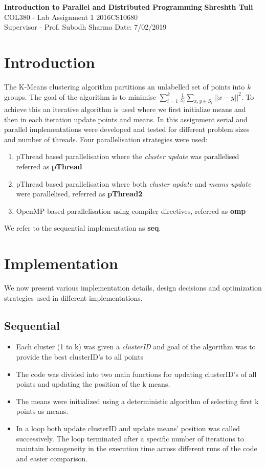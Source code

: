 \documentclass[letter, 11pt, margin=1in]{article}
\begin{document}
\noindent
\large\textbf{Introduction to Parallel and Distributed Programming} \hfill \textbf{Shreshth Tuli} \\
\normalsize COL380 - Lab Assignment 1 \hfill 2016CS10680\\
Supervisor - Prof. Subodh Sharma \hfill Date: 7/02/2019 \\

\section*{Introduction}

The K-Means clustering algorithm partitions an unlabelled set of points into \textit{k} groups. The goal of the algorithm is to minimise $\sum_{i=1}^k\frac{1}{S_i}\sum_{x,y\in S_i}||x-y||^2$. To achieve this an iterative algorithm is used where we first initialize means and then in each iteration update points and means. In this assignment serial and parallel implementations were developed and tested for different problem sizes and number of threads. Four parallelisation strategies were used:
\begin{enumerate}
    \item pThread based parallelisation where the \textit{cluster update} was parallelised referred as \textbf{pThread}
    \item pThread based parallelisation where both \textit{cluster update} and \textit{means update} were parallelised, referred as \textbf{pThread2}
    \item OpenMP based parallelisation using compiler directives, referred as \textbf{omp}
\end{enumerate}
We refer to the sequential implementation as \textbf{seq}.

\section{Implementation}
We now present various implementation details, design decisions and optimization strategies used in different implementations.

\subsection{Sequential}

\begin{itemize}
    \item Each cluster (1 to k) was given a \textit{clusterID} and goal of the algorithm was to provide the best clusterID's to all points
    \item The code was divided into two main functions for updating clusterID's of all points and updating the position of the k means.
    \item The means were initialized using a deterministic algorithm of selecting first k points as means.
    \item In a loop both update clusterID and update means' position was called successively. The loop terminated after a specific number of iterations to maintain homogeneity in the execution time across different runs of the code and easier comparison.
\end{itemize}
\end{document}
